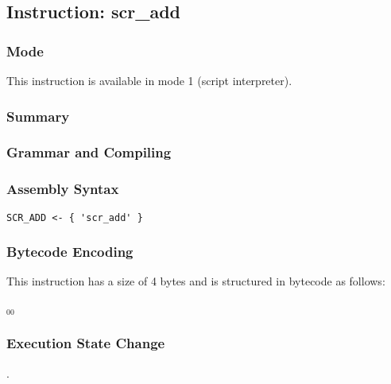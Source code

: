 \subsection{Instruction: scr\_add}

\subsubsection{Mode}
This instruction is available in mode 1 (script interpreter).
\subsubsection{Summary}


\subsubsection{Grammar and Compiling}


\subsubsection{Assembly Syntax}

\begin{myquote}
\begin{verbatim}
SCR_ADD <- { 'scr_add' }
\end{verbatim}
\end{myquote}

\subsubsection{Bytecode Encoding}

This instruction has a size of 4 bytes and is structured in bytecode as follows:

$_{00}$\ 


\subsubsection{Execution State Change}

.


